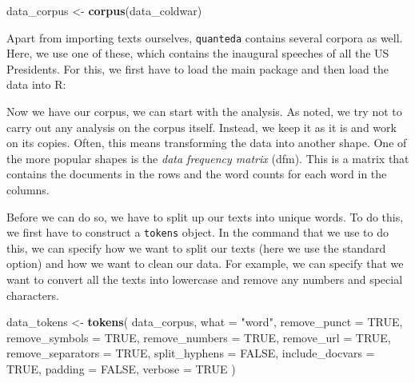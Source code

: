 \documentclass[
]{book}
\newenvironment{Shaded}{\begin{snugshade}}{\end{snugshade}}
\newcommand{\AttributeTok}[1]{\textcolor[rgb]{0.13,0.29,0.53}{#1}}
\newcommand{\ConstantTok}[1]{\textcolor[rgb]{0.56,0.35,0.01}{#1}}
\newcommand{\FunctionTok}[1]{\textcolor[rgb]{0.13,0.29,0.53}{\textbf{#1}}}
\newcommand{\NormalTok}[1]{#1}
\newcommand{\OtherTok}[1]{\textcolor[rgb]{0.56,0.35,0.01}{#1}}
\newcommand{\StringTok}[1]{\textcolor[rgb]{0.31,0.60,0.02}{#1}}
\begin{document}
\begin{Shaded}
\begin{Highlighting}[]
\NormalTok{data\_corpus }\OtherTok{\textless{}{-}} \FunctionTok{corpus}\NormalTok{(data\_coldwar)}
\end{Highlighting}
\end{Shaded}

Apart from importing texts ourselves, \texttt{quanteda} contains several corpora as well. Here, we use one of these, which contains the inaugural speeches of all the US Presidents. For this, we first have to load the main package and then load the data into R:

Now we have our corpus, we can start with the analysis. As noted, we try not to carry out any analysis on the corpus itself. Instead, we keep it as it is and work on its copies. Often, this means transforming the data into another shape. One of the more popular shapes is the \emph{data frequency matrix} (dfm). This is a matrix that contains the documents in the rows and the word counts for each word in the columns.

Before we can do so, we have to split up our texts into unique words. To do this, we first have to construct a \texttt{tokens} object. In the command that we use to do this, we can specify how we want to split our texts (here we use the standard option) and how we want to clean our data. For example, we can specify that we want to convert all the texts into lowercase and remove any numbers and special characters.

\begin{Shaded}
\begin{Highlighting}[]
\NormalTok{data\_tokens }\OtherTok{\textless{}{-}} \FunctionTok{tokens}\NormalTok{(}
\NormalTok{ data\_corpus,}
 \AttributeTok{what =} \StringTok{"word"}\NormalTok{,}
 \AttributeTok{remove\_punct =} \ConstantTok{TRUE}\NormalTok{,}
 \AttributeTok{remove\_symbols =} \ConstantTok{TRUE}\NormalTok{,}
 \AttributeTok{remove\_numbers =} \ConstantTok{TRUE}\NormalTok{,}
 \AttributeTok{remove\_url =} \ConstantTok{TRUE}\NormalTok{,}
 \AttributeTok{remove\_separators =} \ConstantTok{TRUE}\NormalTok{,}
 \AttributeTok{split\_hyphens =} \ConstantTok{FALSE}\NormalTok{,}
 \AttributeTok{include\_docvars =} \ConstantTok{TRUE}\NormalTok{,}
 \AttributeTok{padding =} \ConstantTok{FALSE}\NormalTok{,}
 \AttributeTok{verbose =} \ConstantTok{TRUE}
\NormalTok{)}
\end{Highlighting}
\end{Shaded}
\end{document}
